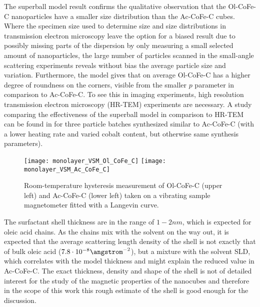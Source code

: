 \documentclass[\main/dresen_thesis.tex]{subfiles}
\begin{document}
    The superball model result confirms the qualitative observation that the Ol-CoFe-C nanoparticles have a smaller size distribution than the Ac-CoFe-C cubes.
    Where the specimen size used to determine size and size distributions in transmission electron microscopy leave the option for a biased result due to possibly missing parts of the dispersion by only measuring a small selected amount of nanoparticles, the large number of particles scanned in the small-angle scattering experiments reveals without bias the average particle size and variation.
    Furthermore, the model gives that on average Ol-CoFe-C has a higher degree of roundness on the corners, visible from the smaller $p$ parameter in comparison to Ac-CoFe-C.
    To see this in imaging experiments, high resolution transmission electron microscopy (HR-TEM) experiments are necessary.
    A study comparing the effectiveness of the superball model in comparison to HR-TEM can be found in  for three particle batches synthesized similar to Ac-CoFe-C (with a lower heating rate and varied cobalt content, but otherwise same synthesis parameters).

    \begin{figure}[tb]
      \centering
      \texttt{[image: monolayer\_VSM\_Ol\_CoFe\_C]}
      \texttt{[image: monolayer\_VSM\_Ac\_CoFe\_C]}
      \caption{\label{fig:monolayers:nanoparticle:vsm}Room-temperature hysteresis measurement of Ol-CoFe-C (upper left) and Ac-CoFe-C (lower left) taken on a vibrating sample magnetometer fitted with a Langevin curve.}
    \end{figure}
    The surfactant shell thickness are in the range of $1 - 2 \unit{nm}$, which is expected for oleic acid chains.
    As the chains mix with the solvent on the way out, it is expected that the average scattering length density of the shell is not exactly that of bulk oleic acid ($7.8 \cdot 10^{-8} \angstrom^{-2}$), but a mixture with the solvent SLD, which correlates with the model thickness and might explain the reduced value in Ac-CoFe-C.
    The exact thickness, density and shape of the shell is not of detailed interest for the study of the magnetic properties of the nanocubes and therefore in the scope of this work this rough estimate of the shell is good enough for the discussion.
\end{document}

